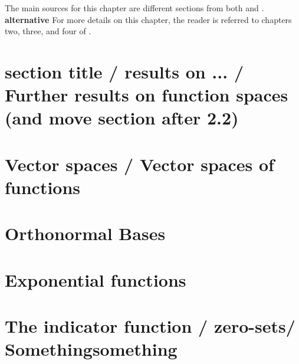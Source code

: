\documentclass[../thesis.tex]{subfiles}
\begin{document}
The main sources for this chapter are different sections from both \cite{heilMetricsNormsInner2018} and \cite{heilIntroductionRealAnalysis2019}.
\textbf{alternative} For more details on this chapter, the reader is referred to chapters two, three, and four of \cite{heilMetricsNormsInner2018}.

\section{section title / results on ... / Further results on function spaces (and move section after 2.2) }
    

\section{Vector spaces / Vector spaces of functions}
    

\section{Orthonormal Bases}
    

\section{Exponential functions}
    

\section{The indicator function / zero-sets/ Somethingsomething}
    
\end{document}
